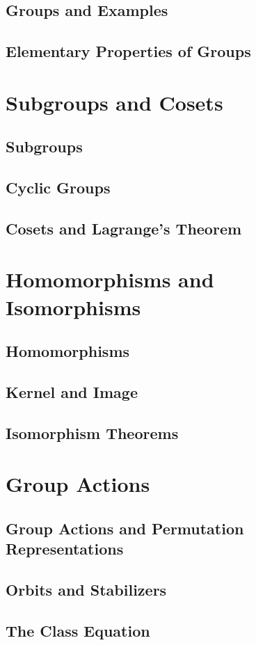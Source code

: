 \documentclass{book}
\begin{document}
\section{Groups and Examples}
\section{Elementary Properties of Groups}

\chapter{Subgroups and Cosets}
\section{Subgroups}
\section{Cyclic Groups}
\section{Cosets and Lagrange's Theorem}

\chapter{Homomorphisms and Isomorphisms}
\section{Homomorphisms}
\section{Kernel and Image}
\section{Isomorphism Theorems}

\chapter{Group Actions}
\section{Group Actions and Permutation Representations}
\section{Orbits and Stabilizers}
\section{The Class Equation}




\printindex
\end{document}
